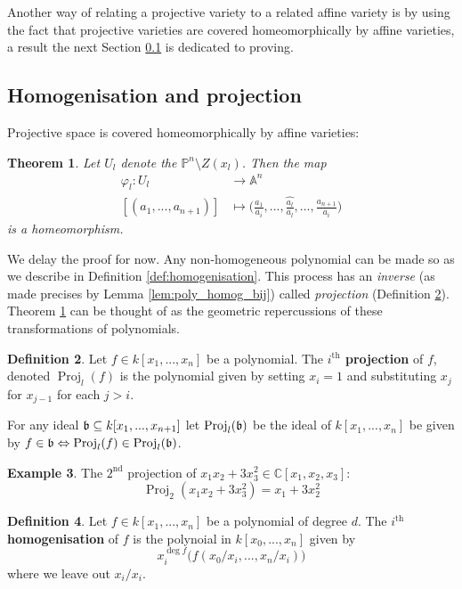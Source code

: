 \documentclass[12pt]{article}
\theoremstyle{plain}
\newtheorem{thm}{Theorem}[subsection] %
\theoremstyle{definition}
\newtheorem{defn}[thm]{Definition} %
\newtheorem{example}[thm]{Example}
\newcommand{\bb}[1]{\mathbb{#1}}
\begin{document}
Another way of relating a projective variety to a related affine variety is by using the fact that projective varieties are covered homeomorphically by affine varieties, a result the next Section \ref{sec:homog_proj} is dedicated to proving.
\subsection{Homogenisation and projection}\label{sec:homog_proj}
Projective space is covered homeomorphically by affine varieties:
\begin{thm}\label{thm:proj_covered_aff}
\label{projaff}
Let $U_l$ denote the $\bb{P}^n\setminus Z(x_l)$. Then the map
\begin{align*}
    \varphi_l: U_l &\to \bb{A}^n\\
    [(a_1,...,a_{n+1})] &\mapsto \Big(\frac{a_1}{a_i},...,\hat{\frac{a_l}{a_l}},...,\frac{a_{n+1}}{a_i}\Big)
\end{align*}
is a homeomorphism.
\end{thm}
We delay the proof for now. Any non-homogeneous polynomial can be made so as we describe in Definition \ref{def:homogenisation}. This process has an \emph{inverse} (as made precises by Lemma \ref{lem:poly_homog_bij}) called \emph{projection} (Definition \ref{def:projection}). Theorem \ref{thm:proj_covered_aff} can be thought of as the geometric repercussions of these transformations of polynomials.
%
\begin{defn}\label{def:projection}
Let $f \in k[x_1,...,x_n]$ be a polynomial. The \textbf{$i^{\text{th}}$ projection} of $f$, denoted $\operatorname{Proj}_l(f)$ is the polynomial given by setting $x_{i} = 1$ and substituting $x_j$ for $x_{j-1}$ for each $j > i$.

For any ideal $\frak{b} \subseteq k[x_1,...,x_{n+1}]$ let $\operatorname{Proj}_l(\frak{b})$ be the ideal of $k[x_1,...,x_n]$ be given by $f \in \frak{b} \Leftrightarrow \operatorname{Proj}_l(f) \in \operatorname{Proj}_l(\frak{b})$.
\end{defn}
\begin{example}
The $2^{\text{nd}}$ projection of $x_1x_2 + 3x_3^2 \in \bb{C}[x_1,x_2,x_3]$:
\begin{equation}
    \operatorname{Proj}_2(x_1x_2 + 3x_3^2) = x_1 + 3x_2^2
\end{equation}
\end{example}
\begin{defn}
Let $f \in k[x_1,...,x_n]$ be a polynomial of degree $d$. The \textbf{$i^{\text{th}}$ homogenisation} of $f$ is the polynoial in $k[x_0,...,x_n]$ given by
\begin{equation}
    x_i^{\operatorname{deg}f}\big(f(x_0/x_i,...,x_n/x_i)\big)
\end{equation}
where we leave out $x_i/x_i$.
\end{defn}
\end{document}
